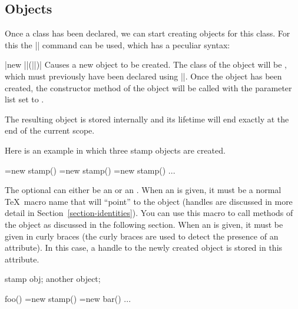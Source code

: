 \subsection{Objects}

Once a class has been declared, we can start creating objects for this class.
For this the |\pgfoonew| command can be used, which has a peculiar syntax:

\begin{command}{\pgfoonew{}|new ||(||)|}
    Causes a new object to be created. The class of the object will be
    , which must previously have been declared using
    |\pgfooclass|. Once the object has been created, the constructor method of
    the object will be called with the parameter list set to .

    The resulting object is stored internally and its lifetime will end exactly
    at the end of the current scope.

    Here is an example in which three stamp objects are created.
\begin{codeexample}
\pgfoonew \firststamp  =new stamp()
\pgfoonew \secondstamp =new stamp()
{
  \pgfoonew \thirdstamp =new stamp()
  ...
}
\end{codeexample}

    The optional  can either be an
     or an . When an 
    is given, it must be a normal \TeX\ macro name that will ``point'' to the
    object (handles are discussed in more detail in
    Section~\ref{section-identities}). You can use this macro to call methods
    of the object as discussed in the following section. When an
     is given, it must be given in curly braces (the curly
    braces are used to detect the presence of an attribute). In this case, a
    handle to the newly created object is stored in this attribute.
\begin{codeexample}
{
  \attribute stamp obj;
  \attribute another object;

  \method foo() {
    =new stamp()
    =new bar()
  }
  ...
}
\end{codeexample}
\end{command}

